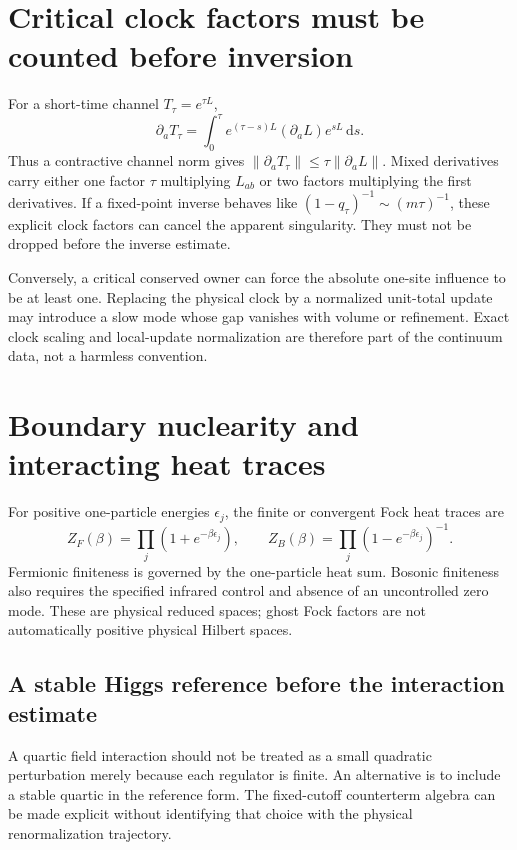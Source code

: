 \documentclass[11pt,a4paper,oneside]{book}
\theoremstyle{plain}
\theoremstyle{definition}
\theoremstyle{remark}
\newcommand{\dd}{\mathrm d}
\newcommand{\norm}[1]{\left\lVert#1\right\rVert}
\newcommand{\src}[2]{\cite{#1}}
\begin{document}
\section{Critical clock factors must be counted before inversion}
For a short-time channel $T_\tau=e^{\tau L}$,
\begin{equation}
 \partial_aT_\tau
 =\int_0^\tau e^{(\tau-s)L}(\partial_aL)e^{sL}\,\dd s.
 \label{eq:duhamel-channel}
\end{equation}
Thus a contractive channel norm gives $\norm{\partial_aT_\tau}\le\tau\norm{\partial_aL}$. Mixed derivatives carry either one factor $\tau$ multiplying $L_{ab}$ or two factors multiplying the first derivatives. If a fixed-point inverse behaves like $(1-q_\tau)^{-1}\sim(m\tau)^{-1}$, these explicit clock factors can cancel the apparent singularity. They must not be dropped before the inverse estimate. \cite{R7,R8}

Conversely, a critical conserved owner can force the absolute one-site influence to be at least one. Replacing the physical clock by a normalized unit-total update may introduce a slow mode whose gap vanishes with volume or refinement. Exact clock scaling and local-update normalization are therefore part of the continuum data, not a harmless convention.

\section{Boundary nuclearity and interacting heat traces}
For positive one-particle energies $\epsilon_j$, the finite or convergent Fock heat traces are
\begin{equation}
 Z_F(\beta)=\prod_j(1+e^{-\beta\epsilon_j}),\qquad
 Z_B(\beta)=\prod_j(1-e^{-\beta\epsilon_j})^{-1}.
 \label{eq:fock-traces}
\end{equation}
Fermionic finiteness is governed by the one-particle heat sum. Bosonic finiteness also requires the specified infrared control and absence of an uncontrolled zero mode. These are physical reduced spaces; ghost Fock factors are not automatically positive physical Hilbert spaces. \src{R15}{thm:v15v89-fermion,thm:v15v89-boson,cor:v15v89-heat}

\subsection{A stable Higgs reference before the interaction estimate}
A quartic field interaction should not be treated as a small quadratic
perturbation merely because each regulator is finite.  An alternative is
to include a stable quartic in the reference form.  The fixed-cutoff
counterterm algebra can be made explicit without identifying that choice
with the physical renormalization trajectory.
\end{document}
